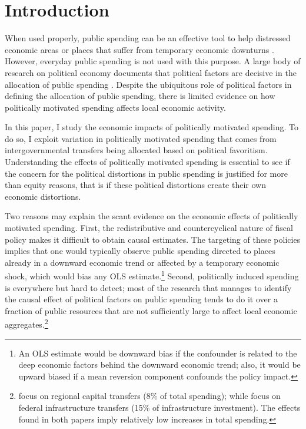 \documentclass[dv_diss_main.tex]{subfiles}
\begin{document}
\section{Introduction}

\noindent When used properly, public spending can be an effective tool to help distressed economic areas or places that suffer from temporary economic downturns \citep{chodorow2019geographic}.
However, everyday public spending is not used with this purpose. A large body of research on political economy documents that political factors are decisive in the allocation of public spending \citep{golden2013distributive}.
Despite the ubiquitous role of political factors in defining the allocation of public spending, there is limited evidence on how politically motivated spending affects local economic activity.

In this paper, I study the economic impacts of politically motivated spending. To do so, I exploit variation in politically motivated spending that comes from intergovernmental transfers being allocated based on political favoritism. Understanding the effects of politically motivated spending is essential to see if the concern for the political distortions in public spending is justified for more than equity reasons, that is if these political distortions create their own economic distortions.

Two reasons may explain the scant evidence on the economic effects of politically motivated spending. First, the redistributive and countercyclical nature of fiscal policy makes it difficult to obtain causal estimates. The targeting of these policies implies that one would typically observe public spending directed to places already in a downward economic trend or affected by a temporary economic shock, which would bias any OLS estimate.\footnote{An OLS estimate would be downward bias if the confounder is related to the deep economic factors behind the downward economic trend; also, it would be upward biased if a mean reversion component confounds the policy impact.}
Second, politically induced spending is everywhere but hard to detect; most of the research that manages to identify the causal effect of political factors on public spending tends to do it over a fraction of public resources that are not sufficiently large to affect local economic aggregates.\footnote{\cite{curto2018does} focus on regional capital transfers (8\% of total spending); while \cite{brollo2012tying} focus on federal infrastructure transfers (15\% of infrastructure investment). The effects found in both papers imply relatively low increases in total spending.}
\end{document}
